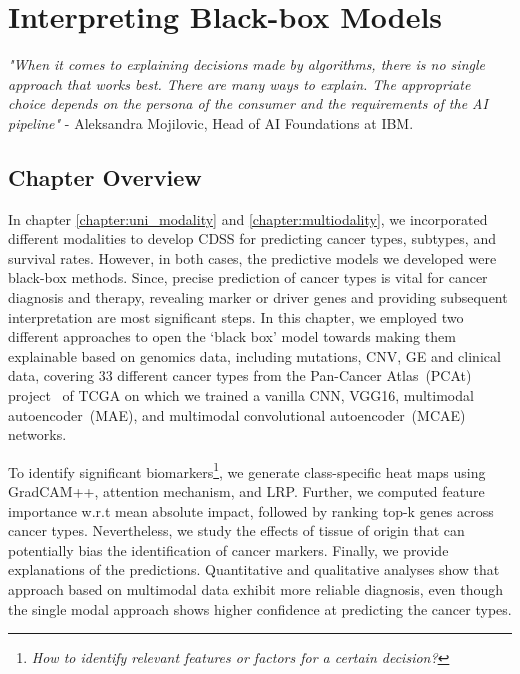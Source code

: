 \chapter{Interpreting Black-box Models}\label{chapter:xai}

\textit{"When it comes to explaining decisions made by algorithms, there is no single approach that works best. There are many ways to explain. The appropriate choice depends on the persona of the consumer and the requirements of the AI pipeline"} - Aleksandra Mojilovic, Head of AI Foundations at IBM. 

\section{Chapter Overview}
In chapter \ref{chapter:uni_modality} and \ref{chapter:multiodality}, we incorporated different modalities to develop CDSS for predicting cancer types, subtypes, and survival rates. However, in both cases, the predictive models we developed were black-box methods. Since, precise prediction of cancer types is vital for cancer diagnosis and therapy, revealing  marker or driver genes and providing subsequent interpretation are most significant steps. In this chapter, we employed two different approaches to open the `black box' model towards making them explainable based on genomics data, including mutations, CNV, GE and clinical data, covering 33 different cancer types from the Pan-Cancer Atlas~(PCAt) project~\cite{weinstein2013cancer} of TCGA on which we trained a vanilla CNN, VGG16, multimodal autoencoder~(MAE), and multimodal convolutional autoencoder~(MCAE) networks.

\hspace*{3.5mm} To identify significant biomarkers\footnote{\textit{How to identify relevant features or factors for a certain decision?}}, we generate class-specific heat maps using GradCAM++, attention mechanism, and LRP. Further, we computed feature importance w.r.t mean absolute impact, followed by ranking top-k genes across cancer types. Nevertheless, we study the effects of tissue of origin that can potentially bias the identification of cancer markers. Finally, we provide explanations of the predictions. Quantitative and qualitative analyses show that approach based on multimodal data exhibit more reliable diagnosis, even though the single modal approach shows higher confidence at predicting the cancer types. \label{chapter_5:cw}

